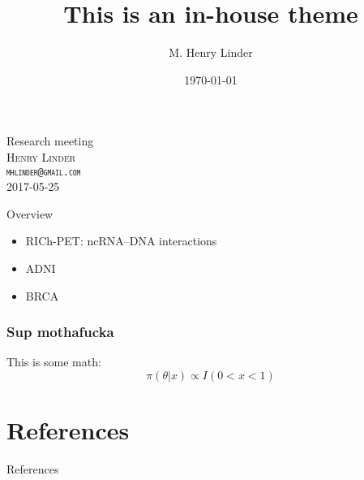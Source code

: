 \documentclass{beamer}
\title{This is an in-house theme}
\author{M. Henry Linder}
\date{\today}
\begin{document}
\begin{frame}
\titlepage
\end{frame}

\begin{frame}
  \Large Research meeting \\[1em]
  \small\scshape{
    Henry Linder \\
    \texttt{mhlinder@gmail.com} \\[1em]
    2017-05-25}
\end{frame}

\begin{frame}{Overview}
  \begin{itemize}
  \item RICh-PET: ncRNA--DNA interactions
  \item ADNI
  \item BRCA
  \end{itemize}
\end{frame}

\begin{frame}
  \frametitle{Sup mothafucka}

  This is some math:
  \[ \pi(\theta|x) \propto I(0<x<1) \]
\end{frame}


\section{References}

\begin{frame}[allowframebreaks]{References}

  
  

\end{frame}
\end{document}

